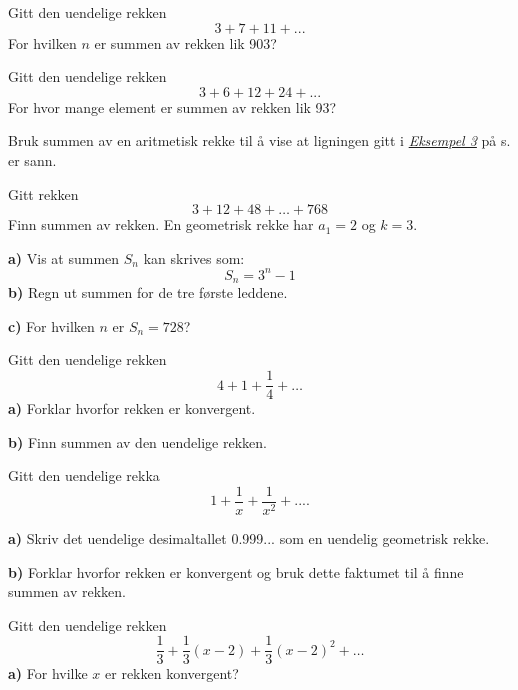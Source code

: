 Gitt den uendelige rekken
\[ 3+7+11+... \] 
For hvilken $ n $ er summen av rekken lik 903?

Gitt den uendelige rekken
\[ 3+6+12+24+... \]	
For hvor mange element er summen av rekken lik 93?

Bruk summen av en aritmetisk rekke til å vise at ligningen gitt i \hyperref[prodind]{\textsl{Eksempel 3}} på s. \pageref{prodind} er sann.

Gitt rekken
\[ 3+12+48+\ldots+768 \]
Finn summen av rekken. 
\newpage
{}
En geometrisk rekke har $ {a_1 = 2} $ og $ {k=3} $.\os 

\textbf{a)} Vis at summen $ S_n $ kan skrives som:
\[ S_n = 3^n-1 \]
\textbf{b)} Regn ut summen for de tre første leddene.\os

\textbf{c)} For hvilken $ n $ er $ S_n=728 $?



\begin{comment}
\textbf{c)} Hvis du fortsetter å spare slik, og medregner innskudd samme måned, når vil du ha 24200 kr på konto? 
\end{comment}

Gitt den uendelige rekken
\[ 4+1+\frac{1}{4}+\ldots \]
\textbf{a)} Forklar hvorfor rekken er konvergent.\os

\textbf{b)} Finn summen av den uendelige rekken.

Gitt den uendelige rekka 
\[ 1+\frac{1}{x}+\frac{1}{x^2}+.... \]

\begin{comment}
	\op{stav} 
	Tenk at uendelig mange personer skal sette sammen en stav. Første person legger på en meter, neste person legger på 0.1 m, neste legger på 0.01 m osv. Hvor lang blir staven?
\end{comment}
\newpage
{}
\textbf{a)} Skriv det uendelige desimaltallet 0.999... som en uendelig geometrisk rekke.\os

\textbf{b)} Forklar hvorfor rekken er konvergent og bruk dette faktumet til å finne summen av rekken. 

Gitt den uendelige rekken
\[\frac{1}{3} +\frac{1}{3}(x-2)+ \frac{1}{3}(x-2)^2+\ldots\]
\textbf{a)} For hvilke $ x $ er rekken konvergent? \os

